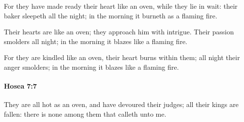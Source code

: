			\begin{versebox}
					\item[BHS] 
					\item[LXX] 
					\item[ASV] For they have made ready their heart like an oven, while they lie in wait: their baker sleepeth all the night; in the morning it burneth as a flaming fire.
					\item[NIV] Their hearts are like an oven; they approach him with intrigue. Their passion smolders all night; in the morning it blazes like a flaming fire.
					\item[NRSV] For they are kindled like an oven, their heart burns within them; all night their anger smolders; in the morning it blazes like a flaming fire.
			\end{versebox}

		\paragraph{Hosea 7:7} %
			\label{HOSEA-7-7}

			They are all hot as an oven, and have devoured their judges; all their kings are fallen: there is none among them that calleth unto me.

